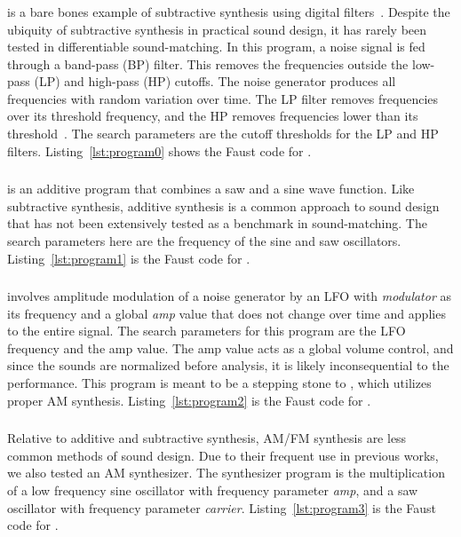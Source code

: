 \subsubsection{\BPNoise}
\label{sec:program0}
\BPNoise{} is a bare bones example of subtractive synthesis using digital filters~\cite{smith2007introduction}. Despite the ubiquity of subtractive synthesis in practical sound design, it has rarely been tested in differentiable sound-matching. In this program, a noise signal is fed through a band-pass (BP) filter. This removes the frequencies outside the low-pass (LP) and high-pass (HP) cutoffs. The noise generator produces all frequencies with random variation over time. The LP filter removes frequencies over its threshold frequency, and the HP removes frequencies lower than its threshold~\cite{smith2007introduction}. The search parameters are the cutoff thresholds for the LP and HP filters. Listing~\ref{lst:program0} shows the Faust code for \BPNoise.

\subsubsection{\AddSineSaw}
\label{sec:program1}
\AddSineSaw{} is an additive program that combines a saw and a sine wave function. Like subtractive synthesis, additive synthesis is a common approach to sound design that has not been extensively tested as a benchmark in sound-matching. The search parameters here are the frequency of the sine and saw oscillators. Listing~\ref{lst:program1} is the Faust code for \AddSineSaw.

\subsubsection{\AmpMod}
\label{sec:program2}
\AmpMod{} involves amplitude modulation of a noise generator by an LFO with \textit{modulator} as its frequency and a global \textit{amp} value that does not change over time and applies to the entire signal. The search parameters for this program are the LFO frequency and the amp value. The amp value acts as a global volume control, and since the sounds are normalized before analysis, it is likely inconsequential to the performance. This program is meant to be a stepping stone to \FMMod, which utilizes proper AM synthesis. Listing~\ref{lst:program2} is the Faust code for \AmpMod. 

\subsubsection{\FMMod}
\label{sec:program3}
Relative to additive and subtractive synthesis, AM/FM synthesis are less common methods of sound design. Due to their frequent use in previous works, we also tested an AM synthesizer. The synthesizer program is the multiplication of a low frequency sine oscillator with frequency parameter \textit{amp}, and a saw oscillator with frequency parameter \textit{carrier}. Listing~\ref{lst:program3} is the Faust code for \FMMod. 





